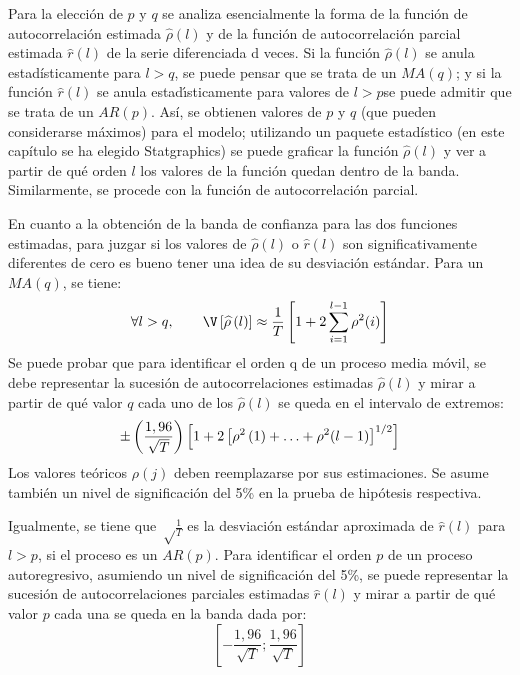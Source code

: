 Para la elecci\'{o}n de $p$ y $q$ se analiza esencialmente la forma de la 
funci\'{o}n de autocorrelaci\'{o}n estimada $\widehat{\rho }(l)$ y de la 
funci\'{o}n de autocorrelaci\'{o}n parcial estimada $\widehat{r}(l)$ de la serie 
diferenciada d veces. Si la funci\'{o}n $\widehat{\rho }(l)$ se anula 
estad\'{i}sticamente para $l>q$, se puede pensar que se trata de un 
$MA(q)$; y si la funci\'{o}n $\widehat{r}(l)$ se anula estad\'{\i}sticamente 
para valores de $l>p $se puede admitir que se trata de un $AR(p).$ As\'{i}, 
se obtienen valores de $p$ y $q$ (que pueden considerarse m\'{a}ximos) para el 
modelo; utilizando un paquete estad\'{i}stico (en este cap\'{i}tulo se ha 
elegido Statgraphics) se puede graficar la funci\'{o}n $\widehat{\rho }(l)$ y 
ver a partir de qu\'{e} orden $l$ los valores de la funci\'{o}n quedan 
dentro de la banda. Similarmente, se procede con la funci\'{o}n de 
autocorrelaci\'{o}n parcial.

En cuanto a la obtenci\'{o}n de la banda de confianza para las dos funciones 
estimadas, para juzgar si los valores de $\widehat{\rho }(l)$ o $\widehat{r}(l)$ son 
significativamente diferentes de cero es bueno tener una idea de su 
desviaci\'{o}n est\'{a}ndar. Para un $MA(q)$, se tiene:
\[
\forall l>q,\qquad      \V\left[ \widehat{\rho }\left( l 
\right) \right]\approx \frac{1}{T}\left[ 1+2\sum_{i=1}^{l-1} {\rho ^{2}(i)} \right]
\]
Se puede probar que para identificar el orden q de un proceso media 
m\'{o}vil, se debe representar la sucesi\'{o}n de autocorrelaciones 
estimadas $\widehat{\rho }(l)$ y mirar a partir de qu\'{e} valor $q$ cada uno de 
los $\widehat{\rho }(l)$ se queda en el intervalo de extremos:
\[
\pm \left( \frac{1,96}{\sqrt T } \right)\left[ 1+2\left[ \rho^{2}\left( 1 
\right)+\mathellipsis +\rho^{2}(l-1) \right]^{1/2} \right]
\]
Los valores te\'{o}ricos $\rho (j)$ deben reemplazarse por sus estimaciones. 
Se asume tambi\'{e}n un nivel de significaci\'{o}n del 5{\%} en la prueba de 
hip\'{o}tesis respectiva.

Igualmente, se tiene que $\sqrt \frac{1}{T} $ es la desviaci\'{o}n 
est\'{a}ndar aproximada de $\widehat{r}(l)$ para $l>p$, si el proceso es un 
$AR(p)$. Para identificar el orden $p$ de un proceso autoregresivo, asumiendo 
un nivel de significaci\'{o}n del 5{\%}, se puede representar la 
sucesi\'{o}n de autocorrelaciones parciales estimadas $\widehat{r}(l)$ y mirar a 
partir de qu\'{e} valor $p$ cada una se queda en la banda dada por:
\[
\left[ -\frac{1,96}{\sqrt T };\frac{1,96}{\sqrt T } \right]
\]


